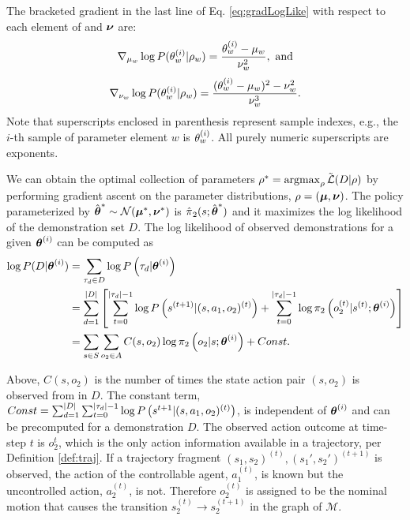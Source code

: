     \par
    The bracketed gradient in the last line of Eq. \ref{eq:gradLogLike} with respect to each element of \vect{\mu} and
    $\boldsymbol{\mathbb{\nu}}$ are:
    \[
    \nabla_{\mu_{\paramIdx}}\log P(\paramElem^{(i)} | \rho_{\paramIdx}) =
        \frac{\paramElem^{(i)} - \mu_{\paramIdx}}{\nu_{\paramIdx}^2},\ \text{and}
    \]
    \[
    \nabla_{\nu_{w}}\log P(\theta_{w}^{(i)} | \rho_{w}) = \frac{(\theta_{w}^{(i)} - \mu_{w})^2 -
        \nu_{w}^2}{\nu_{w}^3}.
    \]
    Note that superscripts enclosed in parenthesis represent sample indexes, e.g., the $i$-th sample of parameter
    element $w$ is $\theta_{w}^{(i)}$. All purely numeric superscripts are exponents.

    We can obtain the optimal collection of parameters $\rho^*= \mathop{\mathrm{argmax}}_{\rho} \tilde{\mathcal{L}{}}(D|\rho)$ by
    performing gradient ascent on the parameter distributions, $\rho = (\boldsymbol{\mathbb{\mu}}, \boldsymbol{\mathbb{\nu}})$. The policy
    parameterized by $\hat{\boldsymbol{\mathbb{\theta}}}^* \sim \mathcal{N}(\boldsymbol{\mathbb{\mu}}^*, \boldsymbol{\mathbb{\nu}}^*)$ is
    $\hat{\pi_{}}_{2}(s; \hat{\boldsymbol{\mathbb{\theta}}}^*)$ and it maximizes the log likelihood of the
    demonstration set $D$. The log likelihood of observed demonstrations for a given $\boldsymbol{\mathbb{\theta}}^{(i)}$ can be computed
    as
    \begin{align*}
        \log P(D|\boldsymbol{\mathbb{\theta}}^{(i)}) & = \sum_{\tau_d \in D} \log P\left(\tau_d |\boldsymbol{\mathbb{\theta}}^{(i)}\right)\\
        & = \sum_{d=1}^{\lvert D\rvert} \left[ \sum_{t=0}^{\lvert\tau_d\rvert-1} \log P \left(s^{(t+1)}|(s, a_1, o_2)^{(t)}\right) +
            \sum_{t=0}^{\lvert\tau_d\rvert-1} \log \pi_{2}\left(o_2^{(t)}|s^{(t)}; \boldsymbol{\mathbb{\theta}}^{(i)}\right) \right]\\
        & = \sum_{s\in S}\sum_{o_2\in A} C(s, o_2) \log \pi_{2}\left(o_2|s; \boldsymbol{\mathbb{\theta}}^{(i)}\right) + Const.
    \end{align*}

    Above, $C(s, o_2)$ is the number of times the state action pair $(s,o_2)$ is observed from in $D$. The constant
    term, $Const =\sum_{d=1}^{\lvert D\rvert} \sum_{t=0}^{\lvert\tau_d\rvert-1} \log P\left(s^{t+1}|(s ,a_1,o_2)^{(t)}\right)$, is
    independent of $\boldsymbol{\mathbb{\theta}}^{(i)}$ and can be precomputed for a demonstration $D$. The observed action outcome at
    time-step $t$ is $o_2^t$, which is the only action information available in a trajectory, per Definition
    \ref{def:traj}. If a trajectory fragment $(s_1, s_2)^{(t)}, (s_1', s_2')^{(t+1)}$ is observed, the action of the
    controllable agent, $a_1^{(t)}$, is known but the uncontrolled action, $a_2^{(t)}$, is not. Therefore $o_2^{(t)}$ is
    assigned to be the nominal motion that causes the transition $s_2^{(t)} \rightarrow s_2^{(t+1)}$ in the graph of
    $\mathcal{M}$.

